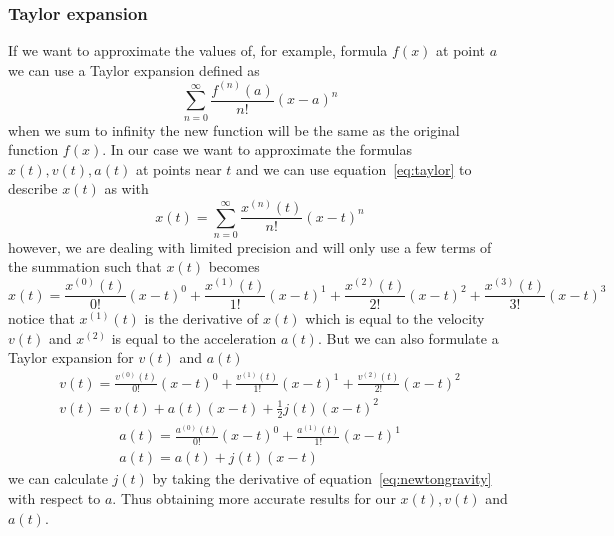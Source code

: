 \documentclass[11pt]{article} %
\begin{document}
\subsubsection{Taylor expansion}
If we want to approximate the values of, for example, formula $f(x)$ at point $a$ we can use a Taylor expansion defined as
\begin{equation}
    \label{eq:taylor}
    \sum^\infty_{n=0} \frac{f^{(n)}(a)}{n!}(x-a)^n
\end{equation}
when we sum to infinity the new function will be the same as the original function $f(x)$. In our case we want to approximate the formulas $x(t), v(t), a(t)$ at points near $t$ and we can use equation~\ref{eq:taylor} to describe $x(t)$ as with 
\begin{equation}
    x(t) = \sum^\infty_{n=0} \frac{x^{(n)}(t)}{n!}(x-t)^n
\end{equation}
however, we are dealing with limited precision and will only use a few terms of the summation such that $x(t)$ becomes
\begin{equation}
    x(t) =  \frac{x^{(0)}(t)}{0!}(x-t)^0 + \frac{x^{(1)}(t)}{1!}(x-t)^1 +\frac{x^{(2)}(t)}{2!}(x-t)^2 +\frac{x^{(3)}(t)}{3!}(x-t)^3
\end{equation}
notice that $x^{(1)}(t)$ is the derivative of $x(t)$ which is equal to the velocity $v(t)$ and $x^{(2)}$ is equal to the acceleration $a(t)$. But we can also formulate a Taylor expansion for $v(t)$ and $a(t)$
\begin{equation}
    \begin{split}
        v(t) =  \frac{v^{(0)}(t)}{0!}(x-t)^0 + \frac{v^{(1)}(t)}{1!}(x-t)^1 +\frac{v^{(2)}(t)}{2!}(x-t)^2\\
        v(t) = v(t) + a(t)(x-t) + \frac{1}{2}j(t)(x-t)^2
    \end{split}
\end{equation}
\begin{equation}
    \begin{split}
        a(t) =  \frac{a^{(0)}(t)}{0!}(x-t)^0 + \frac{a^{(1)}(t)}{1!}(x-t)^1 \\
        a(t) =  a(t) + j(t)(x-t)
    \end{split}
\end{equation}
we can calculate $j(t)$ by taking the derivative of equation~\ref{eq:newtongravity} with respect to $a$. Thus obtaining more accurate results for our $x(t), v(t)$ and $a(t)$.
\end{document}
